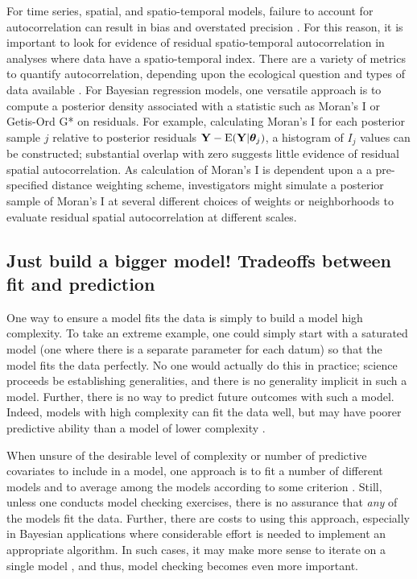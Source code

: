 \documentclass[12pt,english]{article}
\begin{document}
\begin{spacing}{1.9}
For time series, spatial, and spatio-temporal models, failure to account for autocorrelation can result in bias and overstated precision \citep{LichsteinEtAl2002}.  For this reason, it is important to look for evidence of residual spatio-temporal autocorrelation in analyses where data have a spatio-temporal index.  There are a variety of metrics to quantify autocorrelation, depending upon the ecological question and types of data available \cite[e.g.,][]{PerryEtAl2002}.  For Bayesian regression models, one versatile approach is to compute a posterior density associated with a statistic such as Moran's I \citep{Moran1950} or Getis-Ord G* \citep{GetisOrd1992} on residuals.  For example, calculating Moran's I for each posterior sample $j$ relative to posterior residuals ${\bf Y} - \textrm{E}({\bf Y} | \boldsymbol{\theta}_j)$, a histogram of $I_j$ values can be constructed; substantial overlap with zero suggests little evidence of residual spatial autocorrelation.  As calculation of Moran's I is dependent upon a a pre-specified distance weighting scheme, investigators might simulate a posterior sample of Moran's I at several different choices of weights or neighborhoods to evaluate residual spatial autocorrelation at different scales.

\subsection{Just build a bigger model!  Tradeoffs between fit and prediction}

One way to ensure a model fits the data is simply to build a model high complexity.  To take an extreme example, one could simply start with a saturated model (one where there is a separate parameter for each datum) so that the model fits the data perfectly.  No one would actually do this in practice; science proceeds be establishing generalities, and there is no generality implicit in such a model.  Further, there is no way to predict future outcomes with such a model.  Indeed, models with high complexity can fit the data well, but may have poorer predictive ability than a model of lower complexity \citep{BurnhamAnderson2002,HootenHobbs2015}.

When unsure of the desirable level of complexity or number of predictive covariates to include in a model, one approach is to fit a number of different models and to average among the models according to some criterion \citep[see, e.g.,][]{Green1995,HoetingEtAl1999,LinkBarker2006}. Still, unless one conducts model checking exercises, there is no assurance that \textit{any} of the models fit the data.  Further, there are costs to using this approach, especially in Bayesian applications where considerable effort is needed to implement an appropriate algorithm.  In such cases, it may make more sense to iterate on a single model \citep{VerHoefBoveng2015}, and thus, model checking becomes even more important.


\end{spacing}
\end{document}
